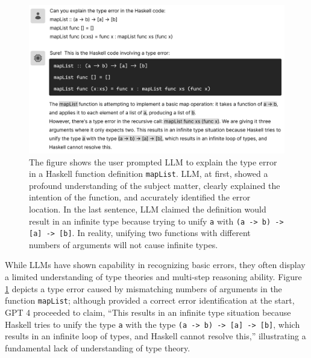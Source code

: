 \begin{figure}[hbt]
  \includegraphics[width=\linewidth]{LLM}
  \caption[LLM explaining a type error; it began very accurate, then went on to give incorrect and contradicting analysis]{\label{fig:llm}
  The figure shows the user prompted LLM to explain the type error in a Haskell function definition \texttt{mapList}. LLM, at first, showed a profound understanding of the subject matter, clearly explained the intention of the function, and accurately identified the error location. In the last sentence, LLM claimed the definition would result in an infinite type because trying to unify \texttt{a} with \texttt{(a -> b) -> [a] -> [b]}. In reality, unifying two functions with different numbers of arguments will not cause infinite types. 
    }
\end{figure}

While LLMs have shown capability in recognizing basic errors, they often display a limited understanding of type theories and multi-step reasoning ability. Figure \ref{fig:llm} depicts a type error caused by mismatching numbers of arguments in the function \texttt{mapList}; although provided a correct error identification at the start, GPT 4 proceeded to claim, “This results in an infinite type situation because Haskell tries to unify the type \texttt{a} with the type \texttt{(a -> b) -> [a] -> [b]}, which results in an infinite loop of types, and Haskell cannot resolve this,” illustrating a fundamental lack of understanding of type theory.

